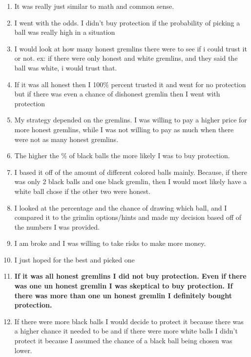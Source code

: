 \documentclass[12pt,a4paper]{article}
\begin{document}
\begin{enumerate}
\item It was really just similar to math and common sense.

\item I went with the odds. I didn't buy protection if the probability of picking a ball was really high in a situation

\item I would look at how many honest gremlins there were to see if i could trust it or not. ex: if there were only honest and white gremlins, and they said the ball was white, i would trust that.

\item If it was all honest then I 100\% percent trusted it and went for no protection but if there was even a chance of dishonest gremlin then I went with protection

\item My strategy depended on the gremlins. I was willing to pay a higher price for more honest gremlins, while I was not willing to pay as much when there were not as many honest gremlins.

\item The higher the \% of black balls the more likely I was to buy protection.

\item I based it off of the amount of different colored balls mainly. Because, if there was only 2 black balls and one black gremlin, then I would most likely have a white ball chose if the other two were honest.

\item I looked at the percentage and the chance of drawing which ball, and I compared it to the grimlin options/hints and made my decision based off of the numbers I was provided.

\item I am broke and I was willing to take risks to make more money.

\item I just hoped for the best and picked one

\item \textbf{If it was all honest gremlins I did not buy protection. Even if there was one un honest gremlin I was skeptical to buy protection. If there was more than one un honest gremlin I definitely bought protection.}

\item If there were more black balls I would decide to protect it because there was a higher chance it needed to be and if there were more white balls I didn't protect it because I assumed the chance of a black ball being chosen was lower.


\end{enumerate}
\end{document}
